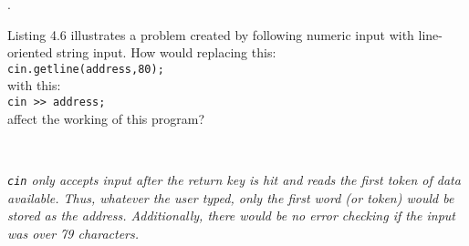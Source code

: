 \documentclass{amsart}
\begin{document}
. 
\begin{minipage}[t]{11.5 cm}
	Listing 4.6 illustrates a problem created by following numeric input with line-oriented string input. How would replacing this: \\[1ex]
\verb+cin.getline(address,80);+ \\[1ex]
with this: \\[1ex]
\verb+cin >> address;+ \\[1ex]
affect the working of this program?
\end{minipage} \\[1ex]
\phantom{3. } 
\begin{minipage}[t]{11.5 cm}
	{\slshape \texttt{cin} only accepts input after the return key is hit and reads the first token of data available. Thus, whatever the user typed, only the first word (or token) would be stored as the address. Additionally, there would be no error checking if the input was over 79 characters. } 
\end{minipage} 
	
\end{document}
